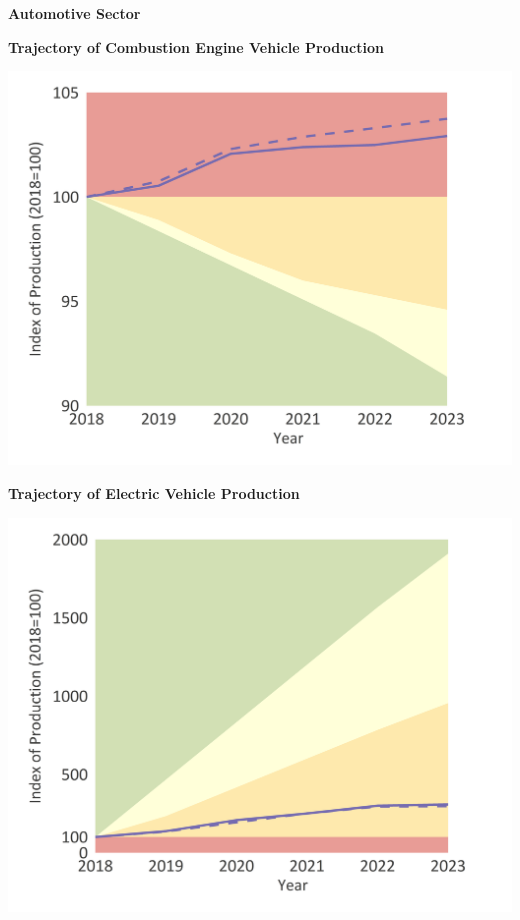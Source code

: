 \documentclass[10pt,table,a4]{article}\usepackage[]{graphicx}\usepackage[]{color}
\begin{document}
		
		\begin{center}
			\textbf{Automotive Sector}
		\end{center}
		
		\begin{minipage}[t]{.49\linewidth}
			\textbf{Trajectory of Combustion Engine Vehicle Production}
	
			\includegraphics[trim = {0 0cm 0 0},width=1\linewidth]{Figures/Fig20}
			
		\end{minipage}	
		\hspace{.02\linewidth}
		\begin{minipage}[t]{.49\textwidth}
			\textbf{Trajectory of Electric Vehicle Production}
			
			\includegraphics[trim = {0 0cm 0 0},width=1\linewidth]{Figures/Fig21}
			
		\end{minipage}		
		
\end{document}
